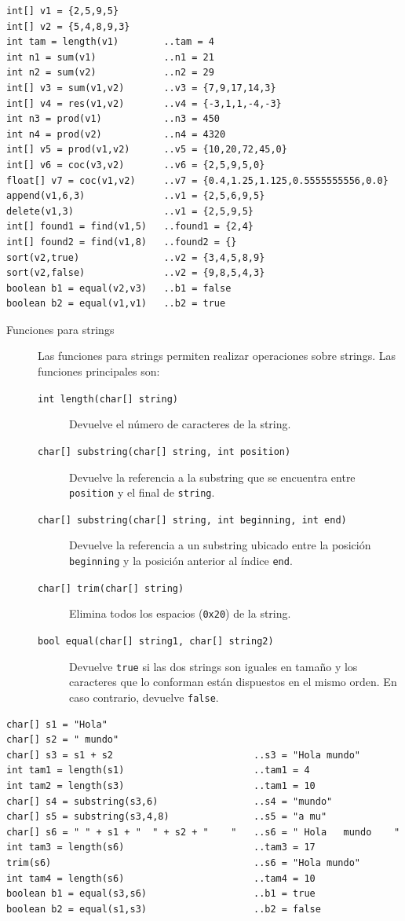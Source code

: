\documentclass[11pt, english]{article}
\begin{document}
\begin{lstlisting}[caption=Ejemplo de uso de funciones primitivas para arrays numéricos]
int[] v1 = {2,5,9,5}
int[] v2 = {5,4,8,9,3}
int tam = length(v1)		..tam = 4
int n1 = sum(v1)			..n1 = 21
int n2 = sum(v2)			..n2 = 29
int[] v3 = sum(v1,v2)		..v3 = {7,9,17,14,3}
int[] v4 = res(v1,v2)		..v4 = {-3,1,1,-4,-3}
int n3 = prod(v1)			..n3 = 450
int n4 = prod(v2)			..n4 = 4320
int[] v5 = prod(v1,v2)		..v5 = {10,20,72,45,0}
int[] v6 = coc(v3,v2)		..v6 = {2,5,9,5,0}
float[] v7 = coc(v1,v2)		..v7 = {0.4,1.25,1.125,0.5555555556,0.0}
append(v1,6,3)				..v1 = {2,5,6,9,5}
delete(v1,3)				..v1 = {2,5,9,5}
int[] found1 = find(v1,5)	..found1 = {2,4}
int[] found2 = find(v1,8)	..found2 = {}
sort(v2,true)				..v2 = {3,4,5,8,9}
sort(v2,false)				..v2 = {9,8,5,4,3}
boolean b1 = equal(v2,v3)	..b1 = false
boolean b2 = equal(v1,v1)	..b2 = true
\end{lstlisting}

\begin{description}
	\item[Funciones para strings] Las funciones para strings permiten realizar operaciones sobre strings. Las funciones principales son:
	\begin{description}
		\item[\texttt{int length(char[] string)}] Devuelve el número de caracteres de la string.
		\item[\texttt{char[] substring(char[] string, int position)}] Devuelve la referencia a la substring que se encuentra entre \texttt{position} y el final de \texttt{string}.
		\item[\texttt{char[] substring(char[] string, int beginning, int end)}] Devuelve la referencia a un substring ubicado entre la posición \texttt{beginning} y la posición anterior al índice \texttt{end}.
		\item[\texttt{char[] trim(char[] string)}] Elimina todos los espacios (\texttt{0x20}) de la string.
		\item[\texttt{bool equal(char[] string1, char[] string2)}] Devuelve \texttt{true} si las dos strings son iguales en tamaño y los caracteres que lo conforman están dispuestos en el mismo orden. En caso contrario, devuelve \texttt{false}.
	\end{description}
\end{description}

\begin{lstlisting}[caption=Ejemplo de uso de funciones primitivas para strings]
char[] s1 = "Hola"
char[] s2 = " mundo"
char[] s3 = s1 + s2							..s3 = "Hola mundo"
int tam1 = length(s1)						..tam1 = 4
int tam2 = length(s3)						..tam1 = 10
char[] s4 = substring(s3,6)					..s4 = "mundo"
char[] s5 = substring(s3,4,8)				..s5 = "a mu"
char[] s6 = " " + s1 + "  " + s2 + "    "	..s6 = " Hola   mundo    "
int tam3 = length(s6)						..tam3 = 17
trim(s6)									..s6 = "Hola mundo"
int tam4 = length(s6)						..tam4 = 10
boolean b1 = equal(s3,s6)					..b1 = true
boolean b2 = equal(s1,s3)					..b2 = false
\end{lstlisting}
\end{document}
